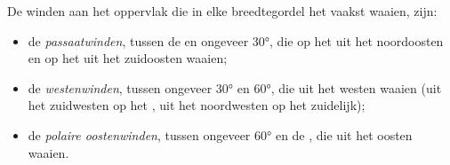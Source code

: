 \begin{definition}\label{def:g8:winds-global-circulation:global-winds}
De winden aan het oppervlak die in elke breedtegordel het vaakst waaien,
zijn:
\begin{itemize}
  \item de \emph{passaatwinden}, tussen de  en
        ongeveer \ang{30}, die op het  uit het noordoosten
        en op het  uit het zuidoosten waaien;
  \item de \emph{westenwinden}, tussen ongeveer
        \ang{30} en \ang{60}, die uit het westen waaien (uit het zuidwesten
        op het , uit het noordwesten op het zuidelijk);
  \item de \emph{polaire oostenwinden}, tussen
        ongeveer \ang{60} en de , die uit het oosten waaien.
\end{itemize}
\end{definition}

